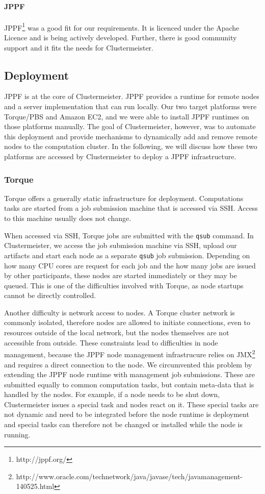 \documentclass{article}
\begin{document}
\paragraph{JPPF} JPPF\footnote{http://jppf.org/} was a good fit for our requirements. It is licenced under the Apache Licence and is being actively developed. Further, there is good community support and it fits the needs for Clustermeister.

\subsection{Deployment}

JPPF is at the core of Clustermeister. JPPF provides a runtime for remote nodes and a server implementation that can run locally. Our two target platforms were Torque/PBS and Amazon EC2, and we were able to install JPPF runtimes on those platforms manually. The goal of Clustermeister, however, was to automate this deployment and provide mechanisms to dynamically add and remove remote nodes to the computation cluster. In the following, we will discuss how these two platforms are accessed by Clustermeister to deploy a JPPF infrastructure.

\subsubsection{Torque}

Torque offers a generally static infrastructure for deployment. Computations tasks are started from a job submission machine that is accessed via SSH. Access to this machine usually does not change.

When accessed via SSH, Torque jobs are submitted with the \texttt{qsub} command. In Clustermeister, we access the job submission machine via SSH, upload our artifacts and start each node as a separate \texttt{qsub} job submission. Depending on how many CPU cores are request for each job and the how many jobs are issued by other participants, these nodes are started immediately or they may be queued. This is one of the difficulties involved with Torque, as node startups cannot be directly controlled.

Another difficulty is network access to nodes. A Torque cluster network is commonly isolated, therefore nodes are allowed to initiate connections, even to resources outside of the local network, but the nodes themselves are not accessible from outside. These constraints lead to difficulties in node management, because the JPPF node management infrastrucure relies on JMX\footnote{http://www.oracle.com/technetwork/java/javase/tech/javamanagement-140525.html} and requires a direct connection to the node. We circumvented this problem by extending the JPPF node runtime with management job submissions. These are submitted equally to common computation tasks, but contain meta-data that is handled by the nodes. For example, if a node needs to be shut down, Clustermeister issues a special task and nodes react on it. These special tasks are not dynamic and need to be integrated before the node runtime is deployment and special tasks can therefore not be changed or installed while the node is running.
\end{document}
